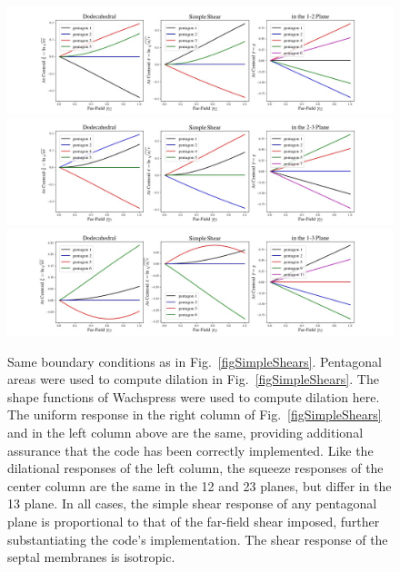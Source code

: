 \begin{figure}
	\centering
	\includegraphics[width=\textwidth]{figures/pentagonalSimpleShear12.jpg} \\
	\includegraphics[width=\textwidth]{figures/pentagonalSimpleShear23.jpg} \\
	\includegraphics[width=\textwidth]{figures/pentagonalSimpleShear13.jpg} \\
	\caption{Same boundary conditions as in Fig.~\ref{figSimpleShears}.  Pentagonal areas were used to compute dilation in Fig.~\ref{figSimpleShears}.  The shape functions of Wachspress were used to compute dilation here. The uniform response in the right column of Fig.~\ref{figSimpleShears} and in the left column above are the same, providing additional assurance that the code has been correctly implemented.  Like the dilational responses of the left column, the squeeze responses of the center column are the same in the 12 and 23 planes, but differ in the 13 plane.  In all cases, the simple shear response of any pentagonal plane is proportional to that of the far-field shear imposed, further substantiating the code's implementation.  The shear response of the septal membranes is isotropic.}
	\label{figSimpleShearsPentagons}
\end{figure}


